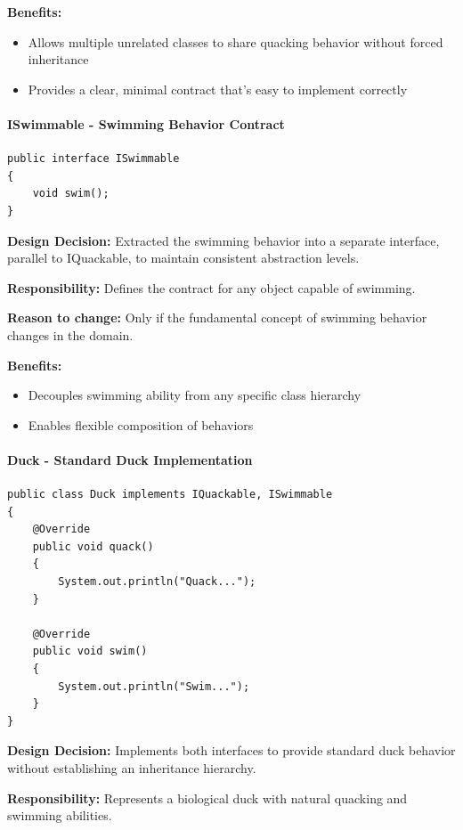 \textbf{Benefits:}
\begin{itemize}
    \item Allows multiple unrelated classes to share quacking behavior without forced inheritance
    \item Provides a clear, minimal contract that's easy to implement correctly
\end{itemize}

\paragraph{ISwimmable - Swimming Behavior Contract}

\begin{verbatim}
public interface ISwimmable
{
    void swim();
}
\end{verbatim}

\textbf{Design Decision:} Extracted the swimming behavior into a separate interface, parallel to IQuackable, to maintain consistent abstraction levels.

\textbf{Responsibility:} Defines the contract for any object capable of swimming.

\textbf{Reason to change:} Only if the fundamental concept of swimming behavior changes in the domain.

\textbf{Benefits:}
\begin{itemize}
    \item Decouples swimming ability from any specific class hierarchy
    \item Enables flexible composition of behaviors
\end{itemize}

\paragraph{Duck - Standard Duck Implementation}

\begin{verbatim}
public class Duck implements IQuackable, ISwimmable
{
    @Override
    public void quack()
    {
        System.out.println("Quack...");
    }

    @Override
    public void swim()
    {
        System.out.println("Swim...");
    }
}
\end{verbatim}

\textbf{Design Decision:} Implements both interfaces to provide standard duck behavior without establishing an inheritance hierarchy.

\textbf{Responsibility:} Represents a biological duck with natural quacking and swimming abilities.


